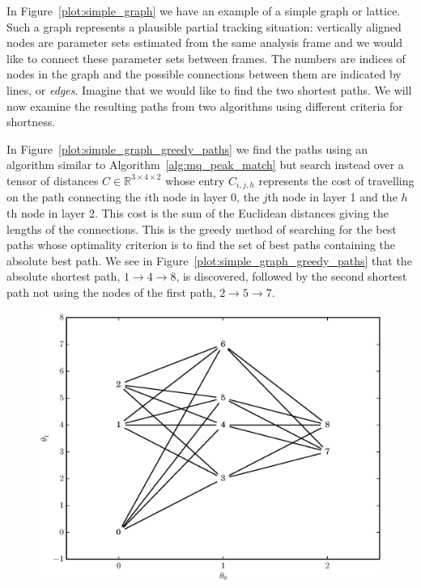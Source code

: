 In Figure~\ref{plot:simple_graph} we have an example of a simple graph or
lattice. Such a graph represents a plausible partial tracking situation:
vertically aligned nodes are parameter sets estimated from the same analysis
frame and we would like to connect these parameter sets between frames. The
numbers are indices of nodes in the graph and the possible connections between
them are indicated by lines, or \textit{edges}. Imagine that we would like to
find the two shortest paths. We will now examine the resulting paths from two
algorithms using different criteria for shortness.

In Figure~\ref{plot:simple_graph_greedy_paths} we find the paths using an
algorithm similar to Algorithm~\ref{alg:mq_peak_match} but search instead over a
tensor of distances $C \in \mathbb{R}^{3 \times 4 \times 2}$ whose entry
$C_{i,j,h}$ represents the cost of travelling on the path connecting the $i$th
node in layer 0, the $j$th node in layer 1 and the $h$th node in layer 2. This
cost is the sum of the Euclidean distances giving the lengths of the
connections. This is the greedy method of searching for the best paths whose
optimality criterion is to find the set of best paths containing the absolute
best path. We see in Figure~\ref{plot:simple_graph_greedy_paths} that the
absolute shortest path, $1 \rightarrow 4 \rightarrow 8$, is discovered, followed
by the second shortest path not using the nodes of the first path, $2
\rightarrow 5 \rightarrow 7$.

\begin{figure}[!t]
    \centering
    \includegraphics[width=\figwidthscale\textwidth]{plots/small_graph_ex.eps}
    \CaptionWithTitle{%
    }{\label{plot:simple_graph}}
\end{figure}

